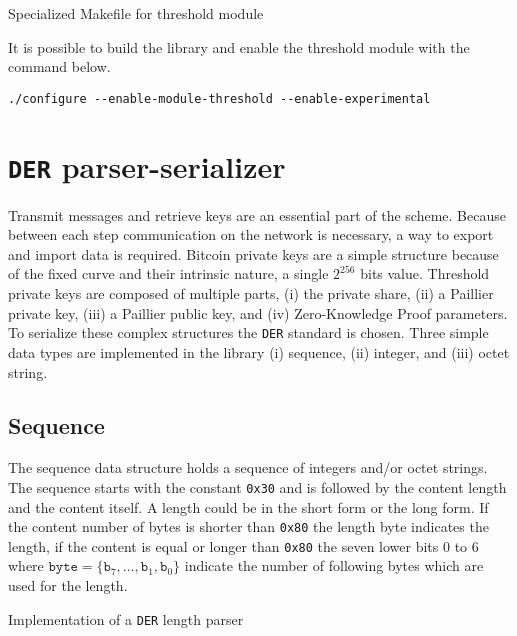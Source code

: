 \begin{listing}
	\caption{Specialized Makefile for threshold module}
	\label{lst:specializedMakefile}
\end{listing}

It is possible to build the library and enable the threshold module with the
command below.

\begin{verbatim}
./configure --enable-module-threshold --enable-experimental
\end{verbatim}


\section{\texttt{DER} parser-serializer}

Transmit messages and retrieve keys are an essential part of the scheme. Because
between each step communication on the network is necessary, a way to export
and import data is required. Bitcoin private keys are a simple structure because
of the fixed curve and their intrinsic nature, a single $2^{256}$ bits value.
Threshold private keys are composed of multiple parts, (i) the private
share, (ii) a Paillier private key, (iii) a Paillier public key, and (iv)
Zero-Knowledge Proof parameters. To serialize these complex structures the
\texttt{DER} standard is chosen. Three simple data types are implemented in the
library (i) sequence, (ii) integer, and (iii) octet string.

\subsection{Sequence}

The sequence data structure holds a sequence of integers and/or octet strings.
The sequence starts with the constant \texttt{0x30} and is followed by the
content length and the content itself. A length could be in the short form or
the long form. If the content number of bytes is shorter than \texttt{0x80} the
length byte indicates the length, if the content is equal or longer than
\texttt{0x80} the seven lower bits 0 to 6 where $\texttt{byte} = \{
\texttt{b}_7, \dots, \texttt{b}_1, \texttt{b}_0\}$ indicate the number of
following bytes which are used for the length.

\begin{listing}
	\caption{Implementation of a \texttt{DER} length parser}
	\label{lst:implDERLengthParser}
\end{listing}

